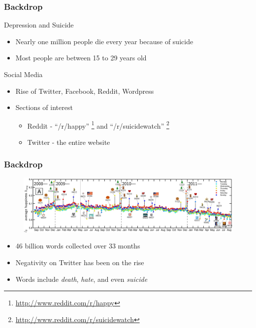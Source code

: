 \documentclass{beamer}
\begin{document}
    \begin{frame}
        \frametitle{Backdrop}
        \begin{block}{Depression and Suicide}
            \begin{itemize}
                \item{Nearly one million people die every year because of suicide}
                \item{Most people are between 15 to 29 years old}
            \end{itemize}
        \end{block}
        \pause
        \begin{block}{Social Media}
            \begin{itemize}
                \item{Rise of Twitter, Facebook, Reddit, Wordpress}
                \item{
                Sections of interest
                \begin{itemize}
                    \item{Reddit - ``/r/happy'' \footnote{\url{http://www.reddit.com/r/happy}} and ``/r/suicidewatch'' \footnote{\url{http://www.reddit.com/r/suicidewatch}}}
                    \item{Twitter - the entire website}
                \end{itemize}
                }
            \end{itemize}
        \end{block}
    \end{frame}
    
    \begin{frame}
        \frametitle{Backdrop}
        \begin{figure}
            \centering
            \includegraphics[width=\textwidth]{figures/twitter_happiness.png}
        \end{figure}
        \begin{itemize}
            \item{46 billion words collected over 33 months}
            \item{Negativity on Twitter has been on the rise}
            \item{Words include \emph{death}, \emph{hate}, and even \emph{suicide}}
        \end{itemize}
    \end{frame}
    
\end{document}
